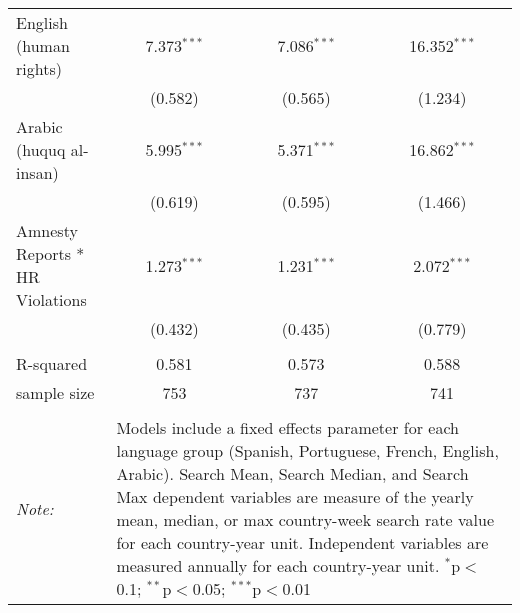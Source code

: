 \begin{table}[!htbp]
\begin{tabular}{@{\extracolsep{5pt}}lccc}
  English (human rights) & 7.373$^{***}$ & 7.086$^{***}$ & 16.352$^{***}$ \\ 
  & (0.582) & (0.565) & (1.234) \\ 
  Arabic (huquq al-insan) & 5.995$^{***}$ & 5.371$^{***}$ & 16.862$^{***}$ \\ 
  & (0.619) & (0.595) & (1.466) \\ 
  Amnesty Reports * HR Violations & 1.273$^{***}$ & 1.231$^{***}$ & 2.072$^{***}$ \\ 
  & (0.432) & (0.435) & (0.779) \\ 
 \hline \\[-1.8ex] 
R-squared  & 0.581 & 0.573 & 0.588 \\ 
sample size  & 753 & 737 & 741 \\ 
\hline 
\hline \\[-1.8ex] 
\textit{Note:}  & \multicolumn{3}{l}{\parbox[t]{8cm}{Models include a fixed effects parameter for each language group (Spanish, Portuguese, French, English, Arabic). Search Mean, Search Median, and Search Max dependent variables are measure of the yearly mean, median, or max country-week search rate value for each country-year unit. Independent variables are measured annually for each country-year unit. $^{*}$p$<$0.1; $^{**}$p$<$0.05; $^{***}$p$<$0.01}} \\ 
\end{tabular} 
\end{table} 
